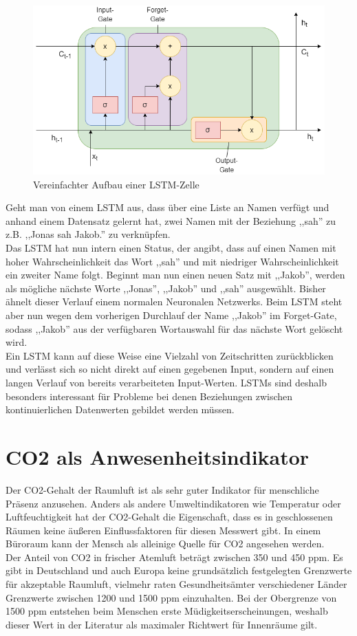 \begin{figure}[h]
    \centering
    \includegraphics[width=12.0cm]{pic/LSTM-Cell.png}
    \caption{Vereinfachter Aufbau einer LSTM-Zelle}
    \label{fig:RecNN}
\end{figure}

Geht man von einem LSTM aus, dass über eine Liste an Namen verfügt und anhand einem Datensatz gelernt
hat, zwei Namen mit der Beziehung ,,sah'' zu z.B. ,,Jonas sah Jakob.'' zu verknüpfen.\\
Das LSTM hat nun intern einen Status, der angibt, dass auf einen Namen mit hoher Wahrscheinlichkeit das Wort 
,,sah'' und mit niedriger Wahrscheinlichkeit ein zweiter Name folgt. 
Beginnt man nun einen neuen Satz mit ,,Jakob'', werden als mögliche nächste Worte ,,Jonas'', ,,Jakob'' und ,,sah''
ausgewählt. Bisher ähnelt dieser Verlauf einem normalen Neuronalen Netzwerks. Beim LSTM
steht aber nun wegen dem vorherigen Durchlauf der Name ,,Jakob'' im Forget-Gate, sodass ,,Jakob'' aus der verfügbaren
Wortauswahl für das nächste Wort gelöscht wird.\\

Ein LSTM kann auf diese Weise eine Vielzahl von Zeitschritten zurückblicken und verlässt sich so nicht direkt auf 
einen gegebenen Input, sondern auf einen langen Verlauf von bereits verarbeiteten Input-Werten. 
LSTMs sind deshalb besonders interessant für Probleme bei denen Beziehungen zwischen kontinuierlichen 
Datenwerten gebildet werden müssen.\newpage

\section{CO2 als Anwesenheitsindikator}\label{CO2}

Der CO2-Gehalt der Raumluft ist als sehr guter Indikator für menschliche Präsenz anzusehen. Anders als andere 
Umweltindikatoren wie Temperatur oder Luftfeuchtigkeit hat der CO2-Gehalt die Eigenschaft, dass es in 
geschlossenen Räumen keine äußeren Einflussfaktoren für diesen Messwert gibt. In einem Büroraum kann der 
Mensch als alleinige Quelle für CO2 angesehen werden.\\
Der Anteil von CO2 in frischer Atemluft beträgt zwischen 350 und 450 ppm. Es gibt in Deutschland und auch Europa 
keine grundsätzlich festgelegten Grenzwerte für akzeptable Raumluft, vielmehr raten Gesundheitsämter 
verschiedener Länder Grenzwerte zwischen 1200 und 1500 ppm einzuhalten. Bei der Obergrenze von 1500 ppm 
entstehen beim Menschen erste Müdigkeitserscheinungen, weshalb dieser Wert in der Literatur als maximaler 
Richtwert für Innenräume gilt.

